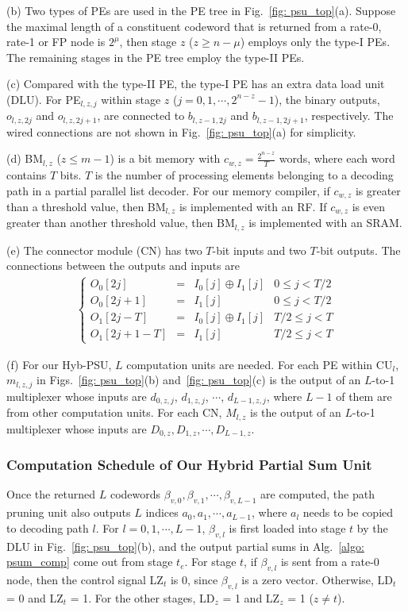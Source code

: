 \documentclass[journal]{IEEEtran}
\begin{document}
(b) Two types of PEs are used in the PE tree in Fig.~\ref{fig: psu_top}(a). Suppose the maximal length of a constituent codeword that is returned from a rate-0, rate-1 or FP node is $2^\mu$, then stage $z$ ($z \geqslant n- \mu$) employs only the type-I PEs. The remaining stages in the PE tree employ the type-II PEs.

(c) Compared with the type-II PE, the type-I PE has an extra data load unit (DLU). For PE$_{l,z,j}$ within stage $z$ ($j=0,1,\cdots,2^{n-z}-1$), the binary outputs, $o_{l,z,2j}$ and $o_{l,z,2j+1}$, are connected to $b_{l,z-1, 2j}$ and $b_{l,z-1, 2j+1}$, respectively. The wired connections are not shown in Fig.~\ref{fig: psu_top}(a) for simplicity.

(d) BM$_{l,z}$ ($z \leqslant m-1$) is a bit memory with $c_{w,z} =\frac{2^{n-z}}{T}$ words, where each word contains $T$ bits. $T$ is the number of processing elements belonging to a decoding path in a partial parallel list decoder. For our memory compiler, if $c_{w,z}$ is greater than a threshold value, then BM$_{l,z}$ is implemented with an RF. If $c_{w,z}$ is even greater than another threshold value, then BM$_{l,z}$ is implemented with an SRAM.

(e) The connector module (CN) has two $T$-bit inputs and two $T$-bit outputs. The connections between the outputs and inputs are
\begin{eqnarray}
\left\{\begin{array}{llll}
O_0[2j]& = & I_0[j] \oplus I_1[j] & 0\leqslant j < T/2\\
O_0[2j+1] & = & I_1[j] & 0\leqslant j < T/2 \\
O_1[2j-T] & = & I_0[j]  \oplus I_1[j] & T/2\leqslant j < T\\
O_1[2j+1-T] & = & I_1[j] & T/2\leqslant j < T
\end{array}
\right.\label{eqn: xor_eq}
\end{eqnarray}

(f) For our Hyb-PSU, $L$ computation units are needed. For each PE within CU$_l$, $m_{l,z,j}$ in Figs.~\ref{fig: psu_top}(b) and~\ref{fig: psu_top}(c) is the output of an $L$-to-1 multiplexer whose inputs are $d_{0,z,j}$, $d_{1,z,j}$, $\cdots$, $d_{L-1,z,j}$, where $L-1$ of them are from other computation units. For each CN, $M_{l,z}$ is the output of an $L$-to-1 multiplexer whose inputs are $D_{0,z}, D_{1,z}, \cdots, D_{L-1,z}$. 
\subsubsection{Computation Schedule of Our Hybrid Partial Sum Unit}
Once the returned $L$ codewords $\beta_{v,0}, \beta_{v,1},\cdots,\beta_{v,L-1}$ are computed, the path pruning unit also outputs $L$ indices $a_0, a_1,\cdots,a_{L-1}$, where $a_l$ needs to be copied to decoding path $l$. For $l=0,1,\cdots,L-1$, $\beta_{v,l}$ is first loaded into stage $t$ by the DLU in Fig.~\ref{fig: psu_top}(b), and the output partial sums in Alg.~\ref{algo: psum_comp} come out from stage $t_e$. For stage $t$, if $\beta_{v,l}$ is sent from a rate-0 node, then the control signal LZ$_t$ is 0, since $\beta_{v,l}$ is a zero vector.  Otherwise, LD$_t$ = 0 and LZ$_t$ = 1. For the other stages, LD$_z$ = 1 and LZ$_z$ = 1 ($z\neq t$).
\end{document}
